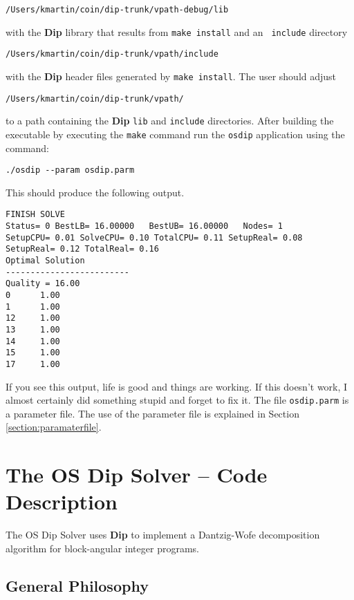 \documentclass[11pt]{article}
\begin{document}
\begin{verbatim}
/Users/kmartin/coin/dip-trunk/vpath-debug/lib
\end{verbatim}
with the {\bf Dip} library that results from {\tt make install} and an {\tt
include} directory
\begin{verbatim}
/Users/kmartin/coin/dip-trunk/vpath/include
\end{verbatim}
with the {\bf Dip} header files generated by {\tt make install}.  The user
should adjust
\begin{verbatim}
/Users/kmartin/coin/dip-trunk/vpath/
\end{verbatim}
to a path containing the {\bf Dip} {\tt lib} and {\tt include} directories. 
After building the executable by executing the {\tt make} command run the {\tt osdip} application using the command:

\begin{verbatim}
./osdip --param osdip.parm
\end{verbatim}

This should produce the following output.


\begin{verbatim}
FINISH SOLVE
Status= 0 BestLB= 16.00000   BestUB= 16.00000   Nodes= 1      
SetupCPU= 0.01 SolveCPU= 0.10 TotalCPU= 0.11 SetupReal= 0.08 
SetupReal= 0.12 TotalReal= 0.16
Optimal Solution
-------------------------
Quality = 16.00
0      1.00
1      1.00
12     1.00
13     1.00
14     1.00
15     1.00
17     1.00

\end{verbatim}

If you see this output, life is good and things are working. If this doesn't
work, I almost certainly did something stupid and forget to fix it.  The file
{\tt osdip.parm} is a parameter file. The use of the parameter file is 
explained in Section \ref{section:paramaterfile}.


\section{The OS Dip Solver -- Code Description}\label{section:osdipsolver}

The OS Dip Solver uses {\bf Dip} to implement a Dantzig-Wofe decomposition
algorithm for block-angular integer programs. 

\subsection{General Philosophy}
\end{document}
